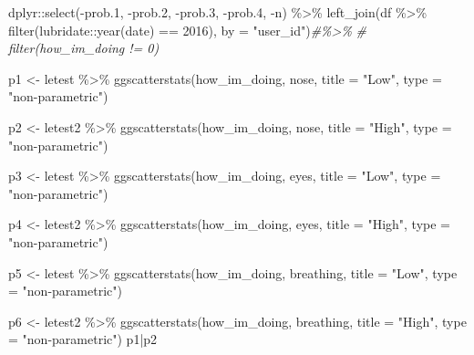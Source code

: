 \documentclass[
]{article}
\newenvironment{Shaded}{\begin{snugshade}}{\end{snugshade}}
\newcommand{\AttributeTok}[1]{\textcolor[rgb]{0.77,0.63,0.00}{#1}}
\newcommand{\CommentTok}[1]{\textcolor[rgb]{0.56,0.35,0.01}{\textit{#1}}}
\newcommand{\DecValTok}[1]{\textcolor[rgb]{0.00,0.00,0.81}{#1}}
\newcommand{\FloatTok}[1]{\textcolor[rgb]{0.00,0.00,0.81}{#1}}
\newcommand{\FunctionTok}[1]{\textcolor[rgb]{0.00,0.00,0.00}{#1}}
\newcommand{\NormalTok}[1]{#1}
\newcommand{\OtherTok}[1]{\textcolor[rgb]{0.56,0.35,0.01}{#1}}
\newcommand{\SpecialCharTok}[1]{\textcolor[rgb]{0.00,0.00,0.00}{#1}}
\newcommand{\StringTok}[1]{\textcolor[rgb]{0.31,0.60,0.02}{#1}}
\begin{document}
\begin{Shaded}
\begin{Highlighting}[]
\NormalTok{  dplyr}\SpecialCharTok{::}\FunctionTok{select}\NormalTok{(}\SpecialCharTok{{-}}\NormalTok{prob}\FloatTok{.1}\NormalTok{,}
          \SpecialCharTok{{-}}\NormalTok{prob}\FloatTok{.2}\NormalTok{,}
          \SpecialCharTok{{-}}\NormalTok{prob}\FloatTok{.3}\NormalTok{,}
          \SpecialCharTok{{-}}\NormalTok{prob}\FloatTok{.4}\NormalTok{,}
          \SpecialCharTok{{-}}\NormalTok{n) }\SpecialCharTok{\%\textgreater{}\%} 
  \FunctionTok{left\_join}\NormalTok{(df }\SpecialCharTok{\%\textgreater{}\%}
  \FunctionTok{filter}\NormalTok{(lubridate}\SpecialCharTok{::}\FunctionTok{year}\NormalTok{(date) }\SpecialCharTok{==} \DecValTok{2016}\NormalTok{),}
         \AttributeTok{by =} \StringTok{"user\_id"}\NormalTok{)}\CommentTok{\#\%\textgreater{}\%}
\CommentTok{\#  filter(how\_im\_doing != 0)}


\NormalTok{p1 }\OtherTok{\textless{}{-}}\NormalTok{ letest }\SpecialCharTok{\%\textgreater{}\%}
  \FunctionTok{ggscatterstats}\NormalTok{(how\_im\_doing, nose, }\AttributeTok{title =} \StringTok{"Low"}\NormalTok{, }\AttributeTok{type =} \StringTok{"non{-}parametric"}\NormalTok{)}


\NormalTok{p2 }\OtherTok{\textless{}{-}}\NormalTok{ letest2 }\SpecialCharTok{\%\textgreater{}\%}
  \FunctionTok{ggscatterstats}\NormalTok{(how\_im\_doing, nose, }\AttributeTok{title =} \StringTok{"High"}\NormalTok{, }\AttributeTok{type =} \StringTok{"non{-}parametric"}\NormalTok{)}

\NormalTok{p3 }\OtherTok{\textless{}{-}}\NormalTok{ letest }\SpecialCharTok{\%\textgreater{}\%}
  \FunctionTok{ggscatterstats}\NormalTok{(how\_im\_doing, eyes, }\AttributeTok{title =} \StringTok{"Low"}\NormalTok{, }\AttributeTok{type =} \StringTok{"non{-}parametric"}\NormalTok{)}


\NormalTok{p4 }\OtherTok{\textless{}{-}}\NormalTok{ letest2 }\SpecialCharTok{\%\textgreater{}\%}
  \FunctionTok{ggscatterstats}\NormalTok{(how\_im\_doing, eyes, }\AttributeTok{title =} \StringTok{"High"}\NormalTok{, }\AttributeTok{type =} \StringTok{"non{-}parametric"}\NormalTok{)}

\NormalTok{p5 }\OtherTok{\textless{}{-}}\NormalTok{ letest }\SpecialCharTok{\%\textgreater{}\%}
  \FunctionTok{ggscatterstats}\NormalTok{(how\_im\_doing, breathing, }\AttributeTok{title =} \StringTok{"Low"}\NormalTok{, }\AttributeTok{type =} \StringTok{"non{-}parametric"}\NormalTok{)}


\NormalTok{p6 }\OtherTok{\textless{}{-}}\NormalTok{ letest2 }\SpecialCharTok{\%\textgreater{}\%}
  \FunctionTok{ggscatterstats}\NormalTok{(how\_im\_doing, breathing, }\AttributeTok{title =} \StringTok{"High"}\NormalTok{, }\AttributeTok{type =} \StringTok{"non{-}parametric"}\NormalTok{)}
\NormalTok{p1}\SpecialCharTok{|}\NormalTok{p2}
\end{Highlighting}
\end{Shaded}
\end{document}
